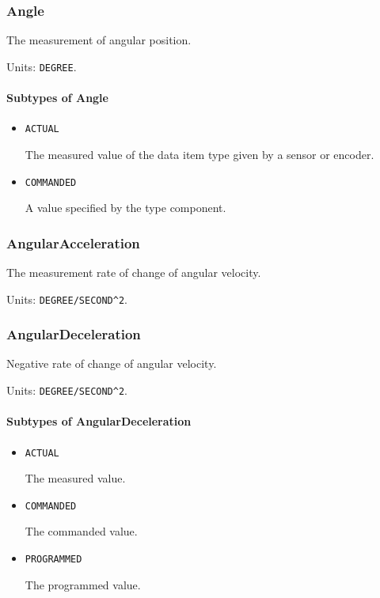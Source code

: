 \subsubsection{Angle}
\label{sec:Angle}



The measurement of angular position.


Units: \texttt{DEGREE}.

\paragraph{Subtypes of Angle}\mbox{}
\label{sec:Subtypes of Angle}

\begin{itemize}

\item \texttt{ACTUAL}


The measured value of the data item type given by a sensor or encoder.

\item \texttt{COMMANDED}


A value specified by the  type component.


\end{itemize}

\subsubsection{AngularAcceleration}
\label{sec:AngularAcceleration}



The measurement rate of change of angular velocity.


Units: \texttt{DEGREE/SECOND\^{}2}.

\subsubsection{AngularDeceleration}
\label{sec:AngularDeceleration}



Negative rate of change of angular velocity.


Units: \texttt{DEGREE/SECOND\^{}2}.

\paragraph{Subtypes of AngularDeceleration}\mbox{}
\label{sec:Subtypes of AngularDeceleration}

\begin{itemize}

\item \texttt{ACTUAL}


The measured value.

\item \texttt{COMMANDED}


The commanded value.

\item \texttt{PROGRAMMED}


The programmed value.


\end{itemize}

